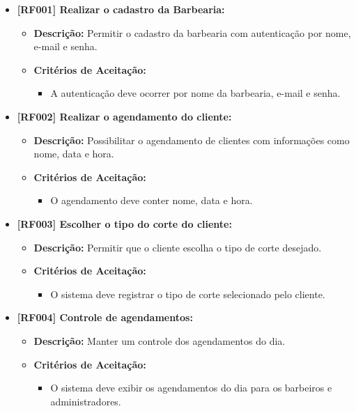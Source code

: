 \documentclass[12pt]{article}
\begin{document}
\begin{itemize}
    \item \textbf{[RF001] Realizar o cadastro da Barbearia:}
    \begin{itemize}
        \item \textbf{Descrição:} Permitir o cadastro da barbearia com autenticação por nome, e-mail e senha.
        \item \textbf{Critérios de Aceitação:}
        \begin{itemize}
            \item A autenticação deve ocorrer por nome da barbearia, e-mail e senha.
        \end{itemize}
    \end{itemize}
    \item \textbf{[RF002] Realizar o agendamento do cliente:}
    \begin{itemize}
        \item \textbf{Descrição:} Possibilitar o agendamento de clientes com informações como nome, data e hora.
        \item \textbf{Critérios de Aceitação:}
        \begin{itemize}
            \item O agendamento deve conter nome, data e hora.
        \end{itemize}
    \end{itemize}
    \item \textbf{[RF003] Escolher o tipo do corte do cliente:}
    \begin{itemize}
        \item \textbf{Descrição:} Permitir que o cliente escolha o tipo de corte desejado.
        \item \textbf{Critérios de Aceitação:}
        \begin{itemize}
            \item O sistema deve registrar o tipo de corte selecionado pelo cliente.
        \end{itemize}
    \end{itemize}
    \item \textbf{[RF004] Controle de agendamentos:}
    \begin{itemize}
        \item \textbf{Descrição:} Manter um controle dos agendamentos do dia.
        \item \textbf{Critérios de Aceitação:}
        \begin{itemize}
            \item O sistema deve exibir os agendamentos do dia para os barbeiros e administradores.

\end{itemize}
\end{itemize}
\end{itemize}
\end{document}
